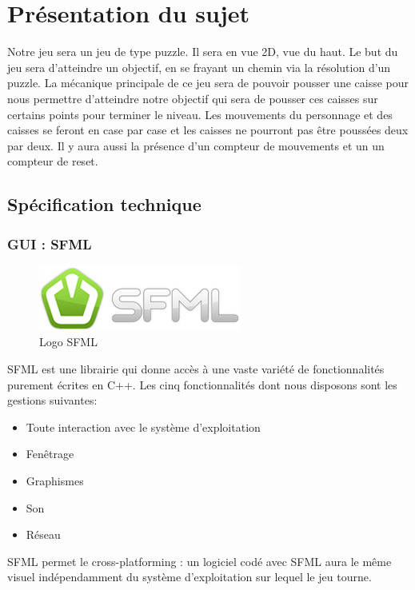 \section{Présentation du sujet}
Notre jeu sera un jeu de type puzzle. Il sera en vue 2D, vue du haut. Le but du jeu sera d’atteindre un objectif, en se frayant un chemin via la résolution d’un puzzle. 
La mécanique principale de ce jeu sera de pouvoir pousser une caisse pour nous permettre d’atteindre notre objectif qui sera de pousser ces caisses sur certains points pour terminer le niveau. 
Les mouvements du personnage et des caisses se feront en case par case et les caisses ne pourront pas être poussées deux par deux. Il y aura aussi la présence d’un compteur de mouvements et  un 
un compteur de reset.

\subsection{Spécification technique}
\subsubsection{GUI : SFML}
\begin{figure}[h]
	\centering
	\includegraphics{pictures/SFML_logo.png}
	\caption{Logo SFML}
	\label{fig:logo_sfml}
\end{figure}
SFML est une librairie qui donne accès à une vaste variété de fonctionnalités purement écrites en C++. Les cinq fonctionnalités dont nous disposons sont les gestions suivantes:
\begin{itemize}
	\item Toute interaction avec le système d'exploitation
	\item Fenêtrage
	\item Graphismes
	\item Son
	\item Réseau
\end{itemize}

SFML permet le cross-platforming : un logiciel codé avec SFML aura le même visuel indépendamment du système d'exploitation sur lequel le jeu tourne.

